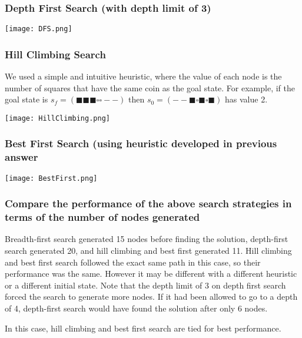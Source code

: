 \documentclass[a4paper]{article}
\newcommand{\coinblack}{\blacksquare}
\newcommand{\coinwhite}{\square}
\newcommand{\coinempty}{-}
\begin{document}
\subsubsection{Depth First Search (with depth limit of 3)}
\begin{center}
\texttt{[image: DFS.png]}
\end{center}


\subsubsection{Hill Climbing Search}
We used a simple and intuitive heuristic, where the value of each node is the number of squares that have the same coin as the goal state.
For example, if the goal state is $s_f = (\coinblack \coinblack \coinblack \coinwhite \coinwhite \coinempty \coinempty)$ then $s_0 = (\coinempty \coinempty \coinblack \coinwhite \coinblack \coinwhite \coinblack)$ has value 2.
\begin{center}
\texttt{[image: HillClimbing.png]}
\end{center}

\subsubsection{Best First Search (using heuristic developed in previous answer}
\begin{center}
\texttt{[image: BestFirst.png]}
\end{center}

\subsubsection{Compare the performance of the above search strategies in terms of the number of nodes generated}
Breadth-first search generated 15 nodes before finding the solution, depth-first search generated 20, and hill climbing and best first generated 11.
Hill climbing and best first search followed the exact same path in this case, so their performance was the same.  However it may be different with a 
different heuristic or a different initial state. Note that the depth limit of 3 on depth first search forced the search to generate more nodes.  If it 
had been allowed to go to a depth of 4, depth-first search would have found the solution after only 6 nodes.

In this case, hill climbing and best first search are tied for best performance.
\end{document}
